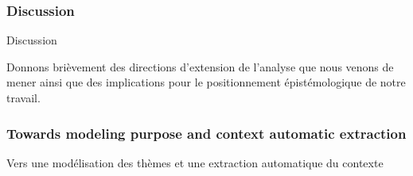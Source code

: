 

\subsubsection{Discussion}{Discussion}

Donnons brièvement des directions d'extension de l'analyse que nous venons de mener ainsi que des implications pour le positionnement épistémologique de notre travail.



\subsubsection{Towards modeling purpose and context automatic extraction}{Vers une modélisation des thèmes et une extraction automatique du contexte}


